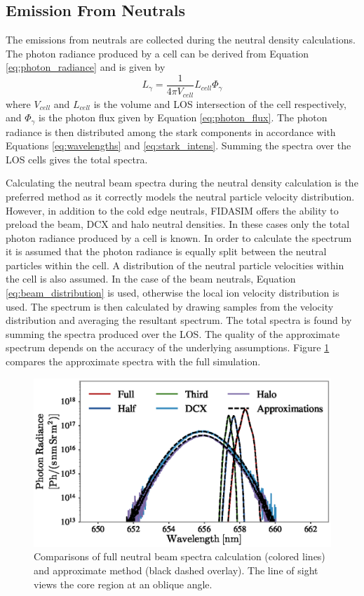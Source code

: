 \subsection{Emission From Neutrals}
The emissions from neutrals are collected during the neutral density calculations. The photon radiance produced by a cell can be derived from Equation \ref{eq:photon_radiance} and is given by
\begin{equation}\label{eq:cell_photon_radiance}
    L_\gamma = \frac{1}{4\pi V_{cell}} L_{cell} \Phi_\gamma
\end{equation}
where $V_{cell}$ and $L_{cell}$ is the volume and LOS intersection of the cell respectively, and $\Phi_\gamma$ is the photon flux given by Equation \ref{eq:photon_flux}.
The photon radiance is then distributed among the stark components in accordance with Equations \ref{eq:wavelengths} and \ref{eq:stark_intens}. Summing the spectra over the LOS cells gives the total spectra.

Calculating the neutral beam spectra during the neutral density calculation is the preferred method as it correctly models the neutral particle velocity distribution. However, in addition to the cold edge neutrals, FIDASIM offers the ability to preload the beam, DCX and halo neutral densities. In these cases only the total photon radiance produced by a cell is known. In order to calculate the spectrum it is assumed that the photon radiance is equally split between the neutral particles within the cell. A distribution of the neutral particle velocities within the cell is also assumed. In the case of the beam neutrals, Equation \ref{eq:beam_distribution} is used, otherwise the local ion velocity distribution is used. The spectrum is then calculated by drawing samples from the velocity distribution and averaging the resultant spectrum. The total spectra is found by summing the spectra produced over the LOS. The quality of the approximate spectrum depends on the accuracy of the underlying assumptions. Figure \ref{fig:approx_spectra} compares the approximate spectra with the full simulation.
\begin{figure}[h!]
    \centering
    \includegraphics[width=12cm]{figures/approx_spectra.eps}
    \caption{Comparisons of full neutral beam spectra calculation (colored lines) and approximate method (black dashed overlay). The line of sight views the core region at an oblique angle.}
    \label{fig:approx_spectra}
\end{figure}

